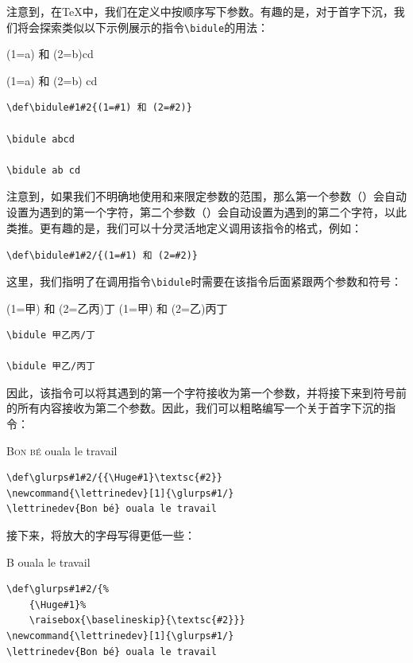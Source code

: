 注意到，在\TeX 中，我们在定义中按顺序写下参数。有趣的是，对于首字下沉，我们将会探索类似以下示例展示的指令\verb|\bidule|的用法：

\begin{codelist}[11.19]{
    \def\bidule#1#2{(1=#1) 和 (2=#2)}

\bidule abcd

\bidule ab cd
}\begin{verbatim}
\def\bidule#1#2{(1=#1) 和 (2=#2)}

\bidule abcd

\bidule ab cd
\end{verbatim}
\end{codelist}

注意到，如果我们不明确地使用\dm{\{}和\dm{\}}来限定参数的范围，那么第一个参数（）会自动设置为遇到的第一个字符，第二个参数（）会自动设置为遇到的第二个字符，以此类推。更有趣的是，我们可以十分灵活地定义调用该指令的格式，例如：

\begin{dmd}
\verb|\def\bidule#1#2/{(1=#1) 和 (2=#2)}|
\end{dmd}

这里，我们指明了在调用指令\verb|\bidule|时需要在该指令后面紧跟两个参数和符号\dm{/}：

\begin{codelist}[11.20]{
\def\bidule#1#2/{(1=#1) 和 (2=#2)}
\bidule 甲乙丙/丁
\bidule 甲乙/丙丁
}\begin{verbatim}
\bidule 甲乙丙/丁

\bidule 甲乙/丙丁
\end{verbatim}
\end{codelist}

因此，该指令可以将其遇到的第一个字符接收为第一个参数，并将接下来到符号\dm{/}前的所有内容接收为第二个参数。因此，我们可以粗略编写一个关于首字下沉的指令：

\begin{codelist}[11.21]{
\def\glurps#1#2/{{\Huge#1}\textsc{#2}}
\newcommand{\lettrinedev}[1]{\glurps#1/}
\lettrinedev{Bon bé} ouala le travail
}\begin{verbatim}
\def\glurps#1#2/{{\Huge#1}\textsc{#2}}
\newcommand{\lettrinedev}[1]{\glurps#1/}
\lettrinedev{Bon bé} ouala le travail
\end{verbatim}
\end{codelist}

接下来，将放大的字母写得更低一些：

\begin{codelist}[11.22]{
    \def\glurps#1#2/{%
    {\Huge#1}%
    \raisebox{\baselineskip}{\textsc{#2}}}
\newcommand{\lettrinedev}[1]{\glurps#1/}
\lettrinedev{Bon bé} ouala le travail
}\begin{verbatim}
\def\glurps#1#2/{%
    {\Huge#1}%
    \raisebox{\baselineskip}{\textsc{#2}}}
\newcommand{\lettrinedev}[1]{\glurps#1/}
\lettrinedev{Bon bé} ouala le travail
\end{verbatim}
\end{codelist}

